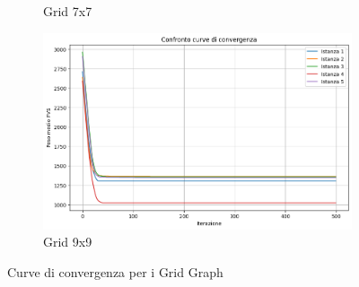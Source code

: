 \documentclass[a4paper, 10pt]{article}
\begin{document}
\begin{figure}[H]
\begin{subfigure}[t]{0.45\textwidth}
\caption{Grid 7x7}
\label{fig:grid2}
\end{subfigure}
\hfill
\begin{subfigure}[t]{0.45\textwidth}
\centering
\includegraphics[width=\linewidth]{./img/grid_9_9.png}
\caption{Grid 9x9}
\label{fig:grid3}
\end{subfigure}
\caption{Curve di convergenza per i Grid Graph}
\label{fig:grid_grafici}
\end{figure}
\end{document}
